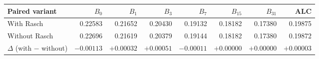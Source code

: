 \begin{tabular}{lrrrrrrr}
\toprule
Paired variant & $B_0$ & $B_1$ & $B_3$ & $B_7$ & $B_{15}$ & $B_{31}$ & ALC\\
\midrule
With Rasch & 0.22583 & 0.21652 & 0.20430 & 0.19132 & 0.18182 & 0.17380 & 0.19875\\
Without Rasch & 0.22696 & 0.21619 & 0.20379 & 0.19144 & 0.18182 & 0.17380 & 0.19872\\
$\Delta$ (with $-$ without) & $-0.00113$ & $+0.00032$ & $+0.00051$ & $-0.00011$ & $+0.00000$ & $+0.00000$ & $+0.00003$\\
\bottomrule
\end{tabular}
